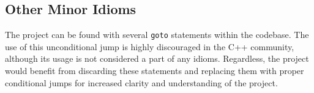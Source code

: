 \subsection{Other Minor Idioms}
The project can be found with several \texttt{goto} statements within the codebase. The use of this unconditional jump is highly discouraged in the C++ community, although its usage is not considered a part of any idioms. Regardless, the project would benefit from discarding these statements and replacing them with proper conditional jumps for increased clarity and understanding of the project.
